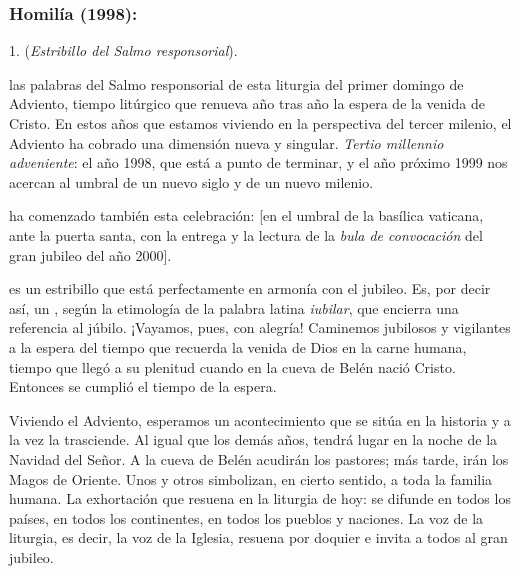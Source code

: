 \subsubsection{Homilía (1998): }


\begin{body}
	1.  (\emph{Estribillo del Salmo responsorial}). 
	
	 las palabras del Salmo responsorial de esta liturgia del primer domingo de Adviento, tiempo litúrgico que renueva año tras año la espera de la venida de Cristo. En estos años que estamos viviendo en la perspectiva del tercer milenio, el Adviento ha cobrado una dimensión nueva y singular. \emph{Tertio millennio adveniente}: el año 1998, que está a punto de terminar, y el año próximo 1999 nos acercan al umbral de un nuevo siglo y de un nuevo milenio. 
	
	 ha comenzado también esta celebración: {[}en el umbral de la basílica vaticana, ante la puerta santa, con la entrega y la lectura de la \emph{bula de convocación} del gran jubileo del año 2000{]}. 
	
	 es un estribillo que está perfectamente en armonía con el jubileo. Es, por decir así, un , según la etimología de la palabra latina \emph{iubilar}, que encierra una referencia al júbilo. ¡Vayamos, pues, con alegría! Caminemos jubilosos y vigilantes a la espera del tiempo que recuerda la venida de Dios en la carne humana, tiempo que llegó a su plenitud cuando en la cueva de Belén nació Cristo. Entonces se cumplió el tiempo de la espera. 
	
	Viviendo el Adviento, esperamos un acontecimiento que se sitúa en la historia y a la vez la trasciende. Al igual que los demás años, tendrá lugar en la noche de la Navidad del Señor. A la cueva de Belén acudirán los pastores; más tarde, irán los Magos de Oriente. Unos y otros simbolizan, en cierto sentido, a toda la familia humana. La exhortación que resuena en la liturgia de hoy:  se difunde en todos los países, en todos los continentes, en todos los pueblos y naciones. La voz de la liturgia, es decir, la voz de la Iglesia, resuena por doquier e invita a todos al gran jubileo. 
	

\end{body}
